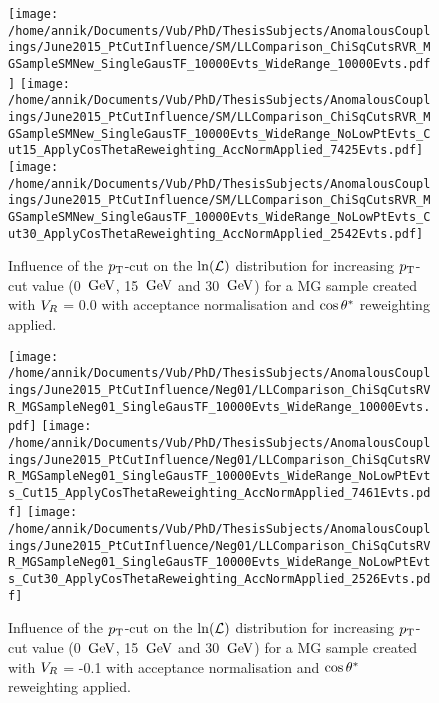 \begin{figure}[h!t]
 \centering
 \texttt{[image: /home/annik/Documents/Vub/PhD/ThesisSubjects/AnomalousCouplings/June2015\_PtCutInfluence/SM/LLComparison\_ChiSqCutsRVR\_MGSampleSMNew\_SingleGausTF\_10000Evts\_WideRange\_10000Evts.pdf]}
 \texttt{[image: /home/annik/Documents/Vub/PhD/ThesisSubjects/AnomalousCouplings/June2015\_PtCutInfluence/SM/LLComparison\_ChiSqCutsRVR\_MGSampleSMNew\_SingleGausTF\_10000Evts\_WideRange\_NoLowPtEvts\_Cut15\_ApplyCosThetaReweighting\_AccNormApplied\_7425Evts.pdf]}
 \texttt{[image: /home/annik/Documents/Vub/PhD/ThesisSubjects/AnomalousCouplings/June2015\_PtCutInfluence/SM/LLComparison\_ChiSqCutsRVR\_MGSampleSMNew\_SingleGausTF\_10000Evts\_WideRange\_NoLowPtEvts\_Cut30\_ApplyCosThetaReweighting\_AccNormApplied\_2542Evts.pdf]}
 \caption{Influence of the $p_{\textrm T}$-cut on the $\ln(\mathcal{L})$ distribution for increasing $p_{\textrm T}$-cut value (0 $\, \mathrm{GeV}$, 15 $\, \mathrm{GeV}$ and 30 $\, \mathrm{GeV}$) for a MG sample created with $V_{R}$ = 0.0 with acceptance normalisation and $\cos \theta^{*}$ reweighting applied.}
 \label{fig::AccNormCosSM}
\end{figure}

\begin{figure}[h!t]
 \centering
 \texttt{[image: /home/annik/Documents/Vub/PhD/ThesisSubjects/AnomalousCouplings/June2015\_PtCutInfluence/Neg01/LLComparison\_ChiSqCutsRVR\_MGSampleNeg01\_SingleGausTF\_10000Evts\_WideRange\_10000Evts.pdf]}
 \texttt{[image: /home/annik/Documents/Vub/PhD/ThesisSubjects/AnomalousCouplings/June2015\_PtCutInfluence/Neg01/LLComparison\_ChiSqCutsRVR\_MGSampleNeg01\_SingleGausTF\_10000Evts\_WideRange\_NoLowPtEvts\_Cut15\_ApplyCosThetaReweighting\_AccNormApplied\_7461Evts.pdf]}
 \texttt{[image: /home/annik/Documents/Vub/PhD/ThesisSubjects/AnomalousCouplings/June2015\_PtCutInfluence/Neg01/LLComparison\_ChiSqCutsRVR\_MGSampleNeg01\_SingleGausTF\_10000Evts\_WideRange\_NoLowPtEvts\_Cut30\_ApplyCosThetaReweighting\_AccNormApplied\_2526Evts.pdf]}
 \caption{Influence of the $p_{\textrm T}$-cut on the $\ln(\mathcal{L})$ distribution for increasing $p_{\textrm T}$-cut value (0 $\, \mathrm{GeV}$, 15 $\, \mathrm{GeV}$ and 30 $\, \mathrm{GeV}$) for a MG sample created with $V_{R}$ = -0.1 with acceptance normalisation and $\cos \theta^{*}$ reweighting applied.}
 \label{fig::AccNormCosNeg01}
\end{figure}

